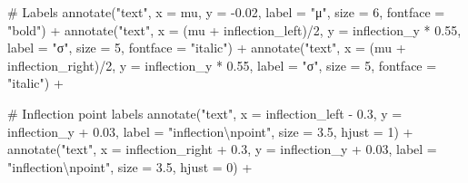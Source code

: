 \documentclass[
  letterpaper,
  DIV=11,
  numbers=noendperiod]{scrreprt}
\newenvironment{Shaded}{\begin{snugshade}}{\end{snugshade}}
\newcommand{\AttributeTok}[1]{\textcolor[rgb]{0.40,0.45,0.13}{#1}}
\newcommand{\CommentTok}[1]{\textcolor[rgb]{0.37,0.37,0.37}{#1}}
\newcommand{\DecValTok}[1]{\textcolor[rgb]{0.68,0.00,0.00}{#1}}
\newcommand{\FloatTok}[1]{\textcolor[rgb]{0.68,0.00,0.00}{#1}}
\newcommand{\FunctionTok}[1]{\textcolor[rgb]{0.28,0.35,0.67}{#1}}
\newcommand{\NormalTok}[1]{\textcolor[rgb]{0.00,0.23,0.31}{#1}}
\newcommand{\SpecialCharTok}[1]{\textcolor[rgb]{0.37,0.37,0.37}{#1}}
\newcommand{\StringTok}[1]{\textcolor[rgb]{0.13,0.47,0.30}{#1}}
\begin{document}
\begin{Shaded}
\begin{Highlighting}[]
  \CommentTok{\# Labels}
  \FunctionTok{annotate}\NormalTok{(}\StringTok{"text"}\NormalTok{, }\AttributeTok{x =}\NormalTok{ mu, }\AttributeTok{y =} \SpecialCharTok{{-}}\FloatTok{0.02}\NormalTok{, }\AttributeTok{label =} \StringTok{"μ"}\NormalTok{, }\AttributeTok{size =} \DecValTok{6}\NormalTok{, }\AttributeTok{fontface =} \StringTok{"bold"}\NormalTok{) }\SpecialCharTok{+}
  \FunctionTok{annotate}\NormalTok{(}\StringTok{"text"}\NormalTok{, }\AttributeTok{x =}\NormalTok{ (mu }\SpecialCharTok{+}\NormalTok{ inflection\_left)}\SpecialCharTok{/}\DecValTok{2}\NormalTok{, }\AttributeTok{y =}\NormalTok{ inflection\_y }\SpecialCharTok{*} \FloatTok{0.55}\NormalTok{,}
           \AttributeTok{label =} \StringTok{"σ"}\NormalTok{, }\AttributeTok{size =} \DecValTok{5}\NormalTok{, }\AttributeTok{fontface =} \StringTok{"italic"}\NormalTok{) }\SpecialCharTok{+}
  \FunctionTok{annotate}\NormalTok{(}\StringTok{"text"}\NormalTok{, }\AttributeTok{x =}\NormalTok{ (mu }\SpecialCharTok{+}\NormalTok{ inflection\_right)}\SpecialCharTok{/}\DecValTok{2}\NormalTok{, }\AttributeTok{y =}\NormalTok{ inflection\_y }\SpecialCharTok{*} \FloatTok{0.55}\NormalTok{,}
           \AttributeTok{label =} \StringTok{"σ"}\NormalTok{, }\AttributeTok{size =} \DecValTok{5}\NormalTok{, }\AttributeTok{fontface =} \StringTok{"italic"}\NormalTok{) }\SpecialCharTok{+}
  
  \CommentTok{\# Inflection point labels}
  \FunctionTok{annotate}\NormalTok{(}\StringTok{"text"}\NormalTok{, }\AttributeTok{x =}\NormalTok{ inflection\_left }\SpecialCharTok{{-}} \FloatTok{0.3}\NormalTok{, }\AttributeTok{y =}\NormalTok{ inflection\_y }\SpecialCharTok{+} \FloatTok{0.03}\NormalTok{,}
           \AttributeTok{label =} \StringTok{"inflection}\SpecialCharTok{\textbackslash{}n}\StringTok{point"}\NormalTok{, }\AttributeTok{size =} \FloatTok{3.5}\NormalTok{, }\AttributeTok{hjust =} \DecValTok{1}\NormalTok{) }\SpecialCharTok{+}
  \FunctionTok{annotate}\NormalTok{(}\StringTok{"text"}\NormalTok{, }\AttributeTok{x =}\NormalTok{ inflection\_right }\SpecialCharTok{+} \FloatTok{0.3}\NormalTok{, }\AttributeTok{y =}\NormalTok{ inflection\_y }\SpecialCharTok{+} \FloatTok{0.03}\NormalTok{,}
           \AttributeTok{label =} \StringTok{"inflection}\SpecialCharTok{\textbackslash{}n}\StringTok{point"}\NormalTok{, }\AttributeTok{size =} \FloatTok{3.5}\NormalTok{, }\AttributeTok{hjust =} \DecValTok{0}\NormalTok{) }\SpecialCharTok{+}
  

\end{Highlighting}
\end{Shaded}
\end{document}
